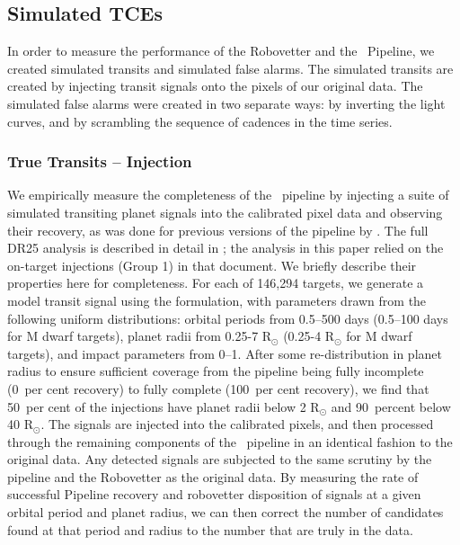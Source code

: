 \subsection{Simulated TCEs}
\label{s:simulated}
In order to measure the performance of the Robovetter and the \Kepler\ Pipeline, we created simulated transits and simulated false alarms. The simulated transits are created by injecting transit signals onto the pixels of our original data. The simulated false alarms were created in two separate ways: by inverting the light curves, and by scrambling the sequence of cadences in the time series. 


\subsubsection{True Transits -- Injection}
\label{injectsec}

We empirically measure the completeness of the \Kepler\ pipeline by injecting a suite of simulated transiting planet signals into the calibrated pixel data and observing their recovery, as was done for previous versions of the pipeline by \citep{Christiansen2013a,Christiansen2015,Christiansen2016}. The full DR25 analysis is described in detail in \citep{Christiansen2017}; the analysis in this paper relied on the on-target injections (Group 1) in that document. We briefly describe their properties here for completeness. For each of 146,294 targets, we generate a model transit signal using the \citet{Mandel2002} formulation, with parameters drawn from the following uniform distributions: orbital periods from 0.5--500 days (0.5--100 days for M dwarf targets), planet radii from 0.25-7 R$_{\odot}$ (0.25-4 R$_{\odot}$ for M dwarf targets), and impact parameters from 0--1. After some re-distribution in planet radius to ensure sufficient coverage from the pipeline being fully incomplete (0~per cent recovery) to fully complete (100~per cent recovery), we find that 50~per cent of the injections have planet radii below 2 R$_{\odot}$ and 90~percent below 40 R$_{\odot}$. The signals are injected into the calibrated pixels, and then processed through the remaining components of the \Kepler\ pipeline in an identical fashion to the original data. Any detected signals are subjected to the same scrutiny by the pipeline and the Robovetter as the original data. By measuring the rate of successful Pipeline recovery and robovetter disposition of signals at a given orbital period and planet radius, we can then correct the number of candidates found at that period and radius to the number that are truly in the data. %


